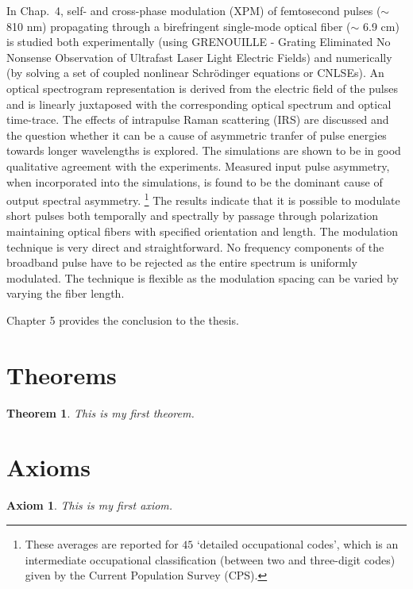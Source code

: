 In Chap.\ 4, self- and cross-phase modulation (XPM) of femtosecond pulses ($\sim$ 810
nm) propagating through a birefringent single-mode optical fiber ($\sim$ 6.9
cm) is studied both experimentally (using GRENOUILLE - Grating Eliminated
No Nonsense Observation of Ultrafast Laser Light Electric Fields)
and numerically
(by solving a set of coupled nonlinear Schr\"odinger equations or
CNLSEs). An optical spectrogram representation is derived from the
electric field of the pulses and is linearly juxtaposed with the
corresponding optical spectrum and optical time-trace. The effects of
intrapulse Raman scattering (IRS) are discussed and the question whether
it can be a cause of asymmetric tranfer of pulse energies towards longer
wavelengths is explored. The simulations are shown to be in good qualitative
agreement with the experiments. Measured input pulse asymmetry, when incorporated
into the simulations, is found to be the dominant cause of output spectral
asymmetry. \renewcommand{\baselinestretch}{1} \small\footnotesize
\footnote{These averages are reported
for $45$ `detailed occupational codes', which is an intermediate
occupational classification (between two and three-digit codes)
given by the Current Population Survey (CPS).}
\renewcommand{\baselinestretch}{2} \small\normalsize
The results indicate that it is possible to modulate short pulses both temporally and spectrally by passage through polarization maintaining
optical fibers with specified orientation and length. The modulation technique is very direct and straightforward. No frequency components of the broadband pulse have to be rejected as the entire spectrum is uniformly modulated. The technique is flexible as the modulation spacing can be varied by varying the fiber length.

Chapter 5 provides the conclusion to the thesis.

\section{Theorems}

\newtheorem{theorem}{Theorem}[chapter]
\begin{theorem}
This is my first theorem.
\end{theorem}


\section{Axioms}
\newtheorem{axiom}{Axiom}[chapter]
\begin{axiom}
This is my first axiom.
\end{axiom}

